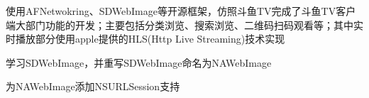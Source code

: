 \documentclass[]{deedy-resume-document-class}
\begin{document}
\begin{minipage}[t]{0.66\textwidth}
\descript{}
\begin{tightemize}
\item 使用AFNetwokring、SDWebImage等开源框架，仿照斗鱼TV完成了斗鱼TV客户端大部门功能的开发；主要包括分类浏览、搜索浏览、二维码扫码观看等；其中实时播放部分使用apple提供的HLS(Http Live Streaming)技术实现
\end{tightemize}
\sectionsep




\descript{}
\begin{tightemize}
\item 学习SDWebImage，并重写SDWebImage命名为NAWebImage
\item 为NAWebImage添加NSURLSession支持 %
\end{tightemize}
\sectionsep







\end{minipage}
\end{document}
